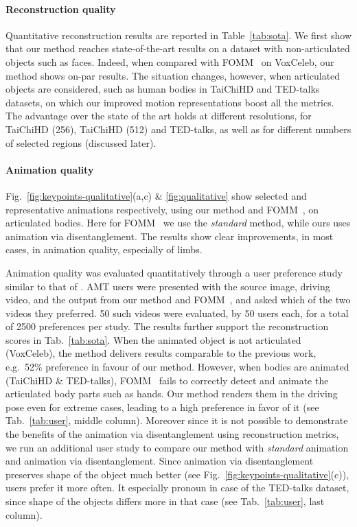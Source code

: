 \documentclass[final]{cvpr}
\begin{document}
\paragraph{Reconstruction quality}
Quantitative reconstruction results are reported in Table~\ref{tab:sota}. We first show that our method reaches state-of-the-art results on a dataset with non-articulated objects such as faces. Indeed, when compared with FOMM~\cite{fomm} on VoxCeleb, our method shows on-par results. The situation changes, however, when articulated objects are considered, such as human bodies in TaiChiHD and TED-talks datasets, on which our improved motion representations boost all the metrics. The advantage over the state of the art holds at different resolutions, for TaiChiHD (256), TaiChiHD (512) and TED-talks, as well as for different numbers of selected regions (discussed later). 

\paragraph{Animation quality}
\vspace{-0.2cm}


Fig.~\ref{fig:keypoints-qualitative}(a,c) \& \ref{fig:qualitative} show selected and representative animations respectively, using our method and FOMM~\cite{fomm}, on articulated bodies. Here for FOMM~\cite{fomm} we use the \emph{standard} method, while ours uses animation via disentanglement. The results show clear improvements, in most cases, in animation quality, especially of limbs.

Animation quality was evaluated quantitatively through a user preference study similar to that of \cite{fomm}. AMT users were presented with the source image, driving video, and the output from our method and FOMM~\cite{fomm}, and asked which of the two videos they preferred. 50 such videos were evaluated, by 50 users each, for a total of 2500 preferences per study.
The results further support the reconstruction scores in Tab.~\ref{tab:sota}. When the animated object is not articulated (VoxCeleb), the method delivers results comparable to the previous work, e.g.\ 52\% preference in favour of our method. However, when bodies are animated (TaiChiHD \& TED-talks), FOMM~\cite{fomm} fails to correctly detect and animate the articulated body parts such as hands. Our method renders them in the driving pose even for extreme cases, leading to a high preference in favor of it (see Tab.~\ref{tab:user}, middle column). Moreover since it is not possible to demonstrate the benefits of the animation via disentanglement using reconstruction metrics, we run an additional user study to compare our method with \emph{standard} animation and animation via disentanglement. Since animation via disentanglement preserves shape of the object much better (see Fig.~\ref{fig:keypoints-qualitative}(c)), users prefer it more often. It especially pronoun in case of the TED-talks dataset, since shape of the objects differs more in that case (see Tab.~\ref{tab:user}, last column). 
\end{document}
